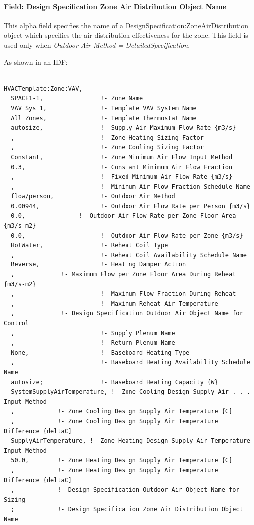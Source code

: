\paragraph{Field: Design Specification Zone Air Distribution Object Name}\label{field-design-specification-zone-air-distribution-object-name-7}

This alpha field specifies the name of a \hyperref[designspecificationzoneairdistribution]{DesignSpecification:ZoneAirDistribution} object which specifies the air distribution effectiveness for the zone. This field is used only when \emph{Outdoor Air Method = DetailedSpecification}.

As shown in an IDF:

\begin{lstlisting}

HVACTemplate:Zone:VAV,
  SPACE1-1,                !- Zone Name
  VAV Sys 1,               !- Template VAV System Name
  All Zones,               !- Template Thermostat Name
  autosize,                !- Supply Air Maximum Flow Rate {m3/s}
  ,                        !- Zone Heating Sizing Factor
  ,                        !- Zone Cooling Sizing Factor
  Constant,                !- Zone Minimum Air Flow Input Method
  0.3,                     !- Constant Minimum Air Flow Fraction
  ,                        !- Fixed Minimum Air Flow Rate {m3/s}
  ,                        !- Minimum Air Flow Fraction Schedule Name
  flow/person,             !- Outdoor Air Method
  0.00944,                 !- Outdoor Air Flow Rate per Person {m3/s}
  0.0,               !- Outdoor Air Flow Rate per Zone Floor Area {m3/s-m2}
  0.0,                     !- Outdoor Air Flow Rate per Zone {m3/s}
  HotWater,                !- Reheat Coil Type
  ,                        !- Reheat Coil Availability Schedule Name
  Reverse,                 !- Heating Damper Action
  ,             !- Maximum Flow per Zone Floor Area During Reheat {m3/s-m2}
  ,                        !- Maximum Flow Fraction During Reheat
  ,                        !- Maximum Reheat Air Temperature
  ,             !- Design Specification Outdoor Air Object Name for Control
  ,                        !- Supply Plenum Name
  ,                        !- Return Plenum Name
  None,                    !- Baseboard Heating Type
  ,                        !- Baseboard Heating Availability Schedule Name
  autosize;                !- Baseboard Heating Capacity {W}
  SystemSupplyAirTemperature, !- Zone Cooling Design Supply Air . . . Input Method
  ,            !- Zone Cooling Design Supply Air Temperature {C]
  ,            !- Zone Cooling Design Supply Air Temperature Difference {deltaC]
  SupplyAirTemperature, !- Zone Heating Design Supply Air Temperature Input Method
  50.0,        !- Zone Heating Design Supply Air Temperature {C]
  ,            !- Zone Heating Design Supply Air Temperature Difference {deltaC]
  ,            !- Design Specification Outdoor Air Object Name for Sizing
  ;            !- Design Specification Zone Air Distribution Object Name
\end{lstlisting}

